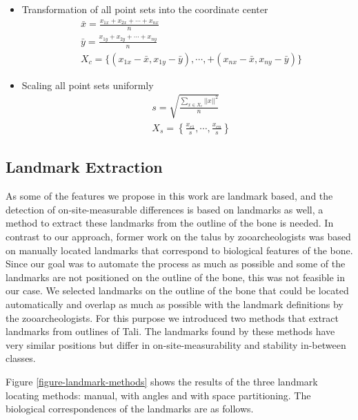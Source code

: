 \documentclass[pdftex,12pt,a4paper]{report}
\begin{document}
\begin{itemize}
	\item Transformation of all point sets into the coordinate center
	\begin{equation}
		\begin{split}
			& \bar{x} = \frac{x_{1x} + x_{2x} + \cdots + x_{nx}}{n} \\
			& \bar{y} = \frac{x_{1y} + x_{2y} + \cdots + x_{ny}}{n} \\
			& X_c = \{ (x_{1x} - \bar{x}, x_{1y} - \bar{y}), \cdots, + (x_{nx} - \bar{x}, x_{ny} - \bar{y}) \}
		\end{split} 
	\end{equation}
	\item Scaling all point sets uniformly
	\begin{equation}
		\begin{split}
			& s = \sqrt{\frac{\sum\limits_{x \in X_c}||x||^2}{n}} \\
			& X_s = \left\{ \frac{x_{c1}}{s}, \cdots, \frac{x_{cn}}{s}\right\}
		\end{split}
	\end{equation}
\end{itemize}

\subsection{Landmark Extraction}
\label{sub:landmarks}

As some of the features we propose in this work are landmark based, and the detection of on-site-measurable differences
is based on landmarks as well, a method to extract these landmarks from the outline of the bone is needed. In contrast to
our approach, former work on the talus by zooarcheologists was based on manually located landmarks that correspond to
biological features of the bone. Since our goal was to automate the process as much as possible and some of the landmarks
are not positioned on the outline of the bone, this was not feasible in our case. We selected landmarks on the outline
of the bone that could be located automatically and overlap as much as possible with the landmark definitions by the
zooarcheologists. For this purpose we introduced two methods that extract landmarks from outlines of Tali. The landmarks
found by these methods have very similar positions but differ in on-site-measurability and stability in-between classes.

Figure \ref{figure-landmark-methods} shows the results of the three landmark locating methods: manual, with angles and
with space partitioning. The biological correspondences of the landmarks are as follows.
\end{document}
